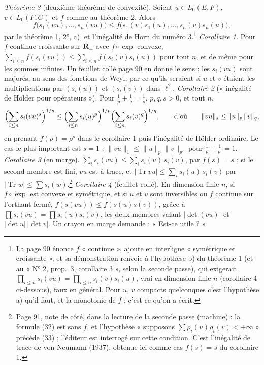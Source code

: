 \documentclass[11pt,a4paper]{article}
\begin{document}
\emph{Théorème 3} (deuxième théorème de convexité). Soient $u \in L_0(E,F)$,
$v \in L_0(F,G)$ et $f$ comme au théorème 2. Alors
\[
  f\bigl(s_1(vu), \ldots, s_n(vu)\bigr) \leq
  f\bigl(s_1(v)s_1(u), \ldots, s_n(v)s_n(u)\bigr),
\]
par le théorème 1, 2°, a), et l'inégalité de Horn du numéro 3.\footnote{La
page 90 énonce $f$ « continue », ajoute en interligne « symétrique et
croissante », et sa démonstration renvoie à l'hypothèse b) du théorème 1
(et au « N° 2, prop.~3, corollaire 3 », selon la seconde passe),
qui exigerait $\prod_{i \leq n} s_i(vu) = \prod_{i \leq n} s_i(v)s_i(u)$,
vrai en dimension finie $n$ (corollaire 4 ci-dessous), faux en général. Pour
$u$, $v$ compacts quelconques c'est l'hypothèse a) qu'il faut, et la
monotonie de $f$ ; c'est ce qu'on a écrit.}
\emph{Corollaire 1.} Pour $f$ continue croissante sur $\mathbf{R}_{+}$ avec
$f\circ\exp$ convexe, $\sum_{i \leq n} f(s_i(vu)) \leq \sum_{i \leq n}
f(s_i(v)s_i(u))$ pour tout $n$, et de même pour les sommes infinies. Un
feuillet collé page 90 en donne le sens : les $s_i(vu)$ sont majorés, au
sens des fonctions de Weyl, par ce qu'ils seraient si $u$ et $v$ étaient
les multiplications par $(s_i(u))$ et $(s_i(v))$ dans $\ell^2$.
\emph{Corollaire 2} (« inégalité de Hölder pour opérateurs »). Pour
$\frac1p + \frac1q = \frac1s$, $p, q, s > 0$, et tout $n$,
\[
  \Bigl(\sum_{i \leq n} s_i(vu)^s\Bigr)^{1/s} \leq
  \Bigl(\sum_{i \leq n} s_i(u)^p\Bigr)^{1/p}\Bigl(\sum_{i \leq n} s_i(v)^q\Bigr)^{1/q},
  \qquad\text{d'où}\qquad
  \|vu\|_s \leq \|u\|_p\,\|v\|_q,
\]
en prenant $f(\rho) = \rho^s$ dans le corollaire 1 puis l'inégalité de
Hölder ordinaire. Le cas le plus important est $s = 1$ : $\|vu\|_1 \leq
\|u\|_p\|v\|_{p'}$ pour $\frac1p + \frac1{p'} = 1$.
\emph{Corollaire 3} (en marge). $\sum_i s_i(vu) \leq \sum_i s_i(u)\,s_i(v)$,
par $f(s) = s$ ; si le second membre est fini, $vu$ est à trace, et
$|\operatorname{Tr} vu| \leq \sum_i s_i(u)\,s_i(v)$ par $|\operatorname{Tr} w|
\leq \sum s_i(w)$.\footnote{Page 91, note de côté, dans la lecture de la
seconde passe (machine) : la formule (32) est sans $f$, et l'hypothèse
« supposons $\sum \rho_i(u)\rho_i(v) < +\infty$ » précède (33) ; l'éditeur
est interrogé sur cette condition. C'est l'inégalité de trace de von Neumann
(1937), obtenue ici comme cas $f(s) = s$ du corollaire 1.}
\emph{Corollaire 4} (feuillet collé). En dimension finie $n$, si $f\circ\exp$
est convexe et symétrique, et si $u$ et $v$ sont inversibles ou $f$ continue
sur l'orthant fermé, $f(s(vu)) \leq f(s(u)s(v))$, grâce à $\prod s_i(vu) =
\prod s_i(u)s_i(v)$, les deux membres valant $|\det(vu)|$ et $|\det u|\,|\det
v|$. Un crayon en marge demande : « Est-ce utile ? »
\end{document}
